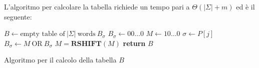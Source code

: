 L'algoritmo per calcolare la tabella richiede un tempo pari a $\Theta(|\Sigma| +
    m)$ ed è il seguente:
\begin{algorithm}
    \begin{algorithmic}
        \State $B \gets \text{empty table of} \ |\Sigma| \ \text{words} \ B_{\sigma}$
        \For{$\sigma \in \Sigma$}
        \State $B_{\sigma} \gets 00\dots0$
        \EndFor
        \State $M \gets 10\dots0$
        \State $\sigma \gets P[j]$
        \State $B_{\sigma} \gets M \ \text{OR} \ B_{\sigma}$
        \State $M = \textbf{RSHIFT} (M)$
        \EndFor
        \State \textbf{return} $B$
        \EndFunction
    \end{algorithmic}
    \caption{Algoritmo per il calcolo della tabella $B$}
\end{algorithm}
